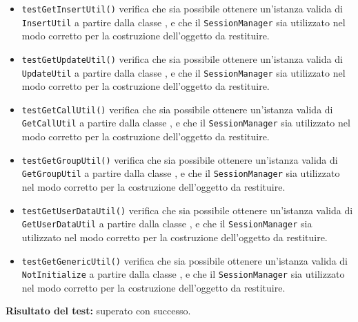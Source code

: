 \begin{itemize}
\begin{itemize}
\item \texttt{testGetInsertUtil()} verifica che sia possibile ottenere un'istanza valida di \\ \texttt{InsertUtil} a partire dalla classe , e che il \texttt{SessionManager} sia utilizzato nel modo corretto per la costruzione dell'oggetto da restituire.

\item \texttt{testGetUpdateUtil()} verifica che sia possibile ottenere un'istanza valida di \\ \texttt{UpdateUtil} a partire dalla classe , e che il \texttt{SessionManager} sia utilizzato nel modo corretto per la costruzione dell'oggetto da restituire.

\item \texttt{testGetCallUtil()} verifica che sia possibile ottenere un'istanza valida di \\ \texttt{GetCallUtil} a partire dalla classe , e che il \texttt{SessionManager} sia utilizzato nel modo corretto per la costruzione dell'oggetto da restituire.

\item \texttt{testGetGroupUtil()} verifica che sia possibile ottenere un'istanza valida di \\ \texttt{GetGroupUtil} a partire dalla classe , e che il \texttt{SessionManager} sia utilizzato nel modo corretto per la costruzione dell'oggetto da restituire.

\item \texttt{testGetUserDataUtil()} verifica che sia possibile ottenere un'istanza valida di \\ \texttt{GetUserDataUtil} a partire dalla classe , e che il \texttt{SessionManager} sia utilizzato nel modo corretto per la costruzione dell'oggetto da restituire.

\item \texttt{testGetGenericUtil()} verifica che sia possibile ottenere un'istanza valida di \\ \texttt{NotInitialize} a partire dalla classe , e che il \texttt{SessionManager} sia utilizzato nel modo corretto per la costruzione dell'oggetto da restituire.

\end{itemize}
\textbf{Risultato del test:} superato con successo.

\end{itemize}


